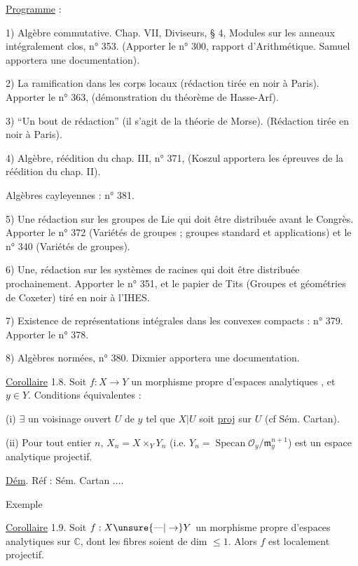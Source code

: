 \uline{Programme} :

1) Algèbre commutative. Chap. VII, Diviseurs, § 4, Modules sur les anneaux intégralement clos, n° 353. (Apporter le n° 300, rapport d'Arithmétique. Samuel apportera une documentation).

2) La ramification dans les corps locaux (rédaction tirée en noir à Paris). Apporter le n° 363, (démonstration du théorème de Hasse-Arf).

3) ``Un bout de rédaction'' (il s'agit de la théorie de Morse). (Rédaction tirée en noir à Paris).

4) Algèbre, réédition du chap. III, n° 371, (Koszul apportera les épreuves de la réédition du chap. II).

Algèbres cayleyennes : n° 381.

5) Une rédaction sur les groupes de Lie qui doit être distribuée avant le Congrès. Apporter le n° 372 (Variétés de groupes ; groupes standard et applications) et le n° 340 (Variétés de groupes).

6) Une, rédaction sur les systèmes de racines qui doit être distribuée prochainement. Apporter le n° 351, et le papier de Tits (Groupes et géométries de Coxeter) tiré en noir à l'IHES.

7) Existence de représentations intégrales dans les convexes compacts : n° 379. Apporter le n° 378.

8) Algèbres normées, n° 380. Dixmier apportera une documentation.


\uline{Corollaire} 1.8. Soit $f:X\to Y$ un morphisme propre d'espaces analytiques , et $y\in Y$. Conditions équivalentes :

(i) $\exists$ un voisinage ouvert $U$ de $y$ tel que $X|U$ soit \uline{proj} sur $U$ (cf Sém. Cartan).

(ii) Pour tout entier $n$, $X_n=X\times_Y Y_n$ (i.e. $Y_n=\operatorname{Specan}\mathcal O_y/\mathfrak m_y^{n+1}$) est  un espace analytique projectif.

\uline{Dém}. Réf : Sém. Cartan ....

Exemple

\uline{Corollaire}  1.9.  Soit $f:X\unsure{\text{---}|\to}Y$ un morphisme propre d'espaces analytiques sur $\mathbb C$,  dont les fibres soient de dim $\leq 1$. Alors $f$ est localement projectif.

